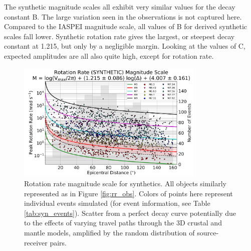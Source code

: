 \documentclass{gji}
\begin{document}
The synthetic magnitude scales all exhibit very similar values for the decay constant B. The large variation seen in the observations is not captured here. Compared to the IASPEI magnitude scale, all values of B for derived synthetic scales fall lower. Synthetic rotation rate gives the largest, or steepest decay constant at 1.215, but only by a negligible margin. Looking at the values of C, expected amplitudes are all also quite high, except for rotation rate.

\begin{figure}
\centerline{\includegraphics[width=0.8\textwidth]{RR_SYN}}
\caption{Rotation rate magnitude scale for synthetics. All objects similarly represented as in Figure \ref{fig:rr_obs}. Colors of points here represent individual events simulated (for event information, see Table \ref{tab:syn_events}). Scatter from a perfect decay curve potentially due to the effects of varying travel paths through the 3D crustal and mantle models, amplified by the random distribution of source-receiver pairs.}
\label{fig:syn_scale}
\end{figure}
\end{document}
